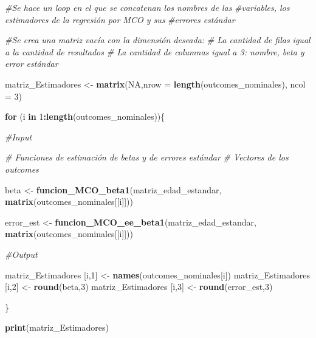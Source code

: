 \documentclass[
]{article}
\newenvironment{Shaded}{\begin{snugshade}}{\end{snugshade}}
\newcommand{\AttributeTok}[1]{\textcolor[rgb]{0.13,0.29,0.53}{#1}}
\newcommand{\CommentTok}[1]{\textcolor[rgb]{0.56,0.35,0.01}{\textit{#1}}}
\newcommand{\ConstantTok}[1]{\textcolor[rgb]{0.56,0.35,0.01}{#1}}
\newcommand{\ControlFlowTok}[1]{\textcolor[rgb]{0.13,0.29,0.53}{\textbf{#1}}}
\newcommand{\DecValTok}[1]{\textcolor[rgb]{0.00,0.00,0.81}{#1}}
\newcommand{\FunctionTok}[1]{\textcolor[rgb]{0.13,0.29,0.53}{\textbf{#1}}}
\newcommand{\NormalTok}[1]{#1}
\newcommand{\OtherTok}[1]{\textcolor[rgb]{0.56,0.35,0.01}{#1}}
\newcommand{\SpecialCharTok}[1]{\textcolor[rgb]{0.81,0.36,0.00}{\textbf{#1}}}
\begin{document}
\begin{Shaded}
\begin{Highlighting}[]
  \CommentTok{\#Se hace un loop en el que se concatenan los nombres de las}
  \CommentTok{\#variables, los estimadores de la regresión por MCO y sus}
  \CommentTok{\#errores estándar}
    
    \CommentTok{\#Se crea una matriz vacía con la dimensión deseada:}
    \CommentTok{\# La cantidad de filas igual a la cantidad de resultados}
    \CommentTok{\# La cantidad de columnas igual a 3: nombre, beta y error estándar}

\NormalTok{    matriz\_Estimadores }\OtherTok{\textless{}{-}} \FunctionTok{matrix}\NormalTok{(}\ConstantTok{NA}\NormalTok{,}\AttributeTok{nrow =} \FunctionTok{length}\NormalTok{(outcomes\_nominales),}
                                 \AttributeTok{ncol =} \DecValTok{3}\NormalTok{)}
    
    \ControlFlowTok{for}\NormalTok{ (i }\ControlFlowTok{in} \DecValTok{1}\SpecialCharTok{:}\FunctionTok{length}\NormalTok{(outcomes\_nominales))\{}
    
    \CommentTok{\#Input}
     
      \CommentTok{\# Funciones de estimación de betas y de errores estándar}
      \CommentTok{\# Vectores de los outcomes}
      
\NormalTok{      beta }\OtherTok{\textless{}{-}} \FunctionTok{funcion\_MCO\_beta1}\NormalTok{(matriz\_edad\_estandar,}
                                \FunctionTok{matrix}\NormalTok{(outcomes\_nominales[[i]]))}
      
\NormalTok{      error\_est }\OtherTok{\textless{}{-}} \FunctionTok{funcion\_MCO\_ee\_beta1}\NormalTok{(matriz\_edad\_estandar,}
                                \FunctionTok{matrix}\NormalTok{(outcomes\_nominales[[i]]))}
      
    \CommentTok{\#Output}
    
  
\NormalTok{      matriz\_Estimadores [i,}\DecValTok{1}\NormalTok{] }\OtherTok{\textless{}{-}}  \FunctionTok{names}\NormalTok{(outcomes\_nominales[i])}
\NormalTok{      matriz\_Estimadores [i,}\DecValTok{2}\NormalTok{] }\OtherTok{\textless{}{-}}  \FunctionTok{round}\NormalTok{(beta,}\DecValTok{3}\NormalTok{)}
\NormalTok{      matriz\_Estimadores [i,}\DecValTok{3}\NormalTok{] }\OtherTok{\textless{}{-}}  \FunctionTok{round}\NormalTok{(error\_est,}\DecValTok{3}\NormalTok{)}
     
\NormalTok{    \}}

\FunctionTok{print}\NormalTok{(matriz\_Estimadores)}
\end{Highlighting}
\end{Shaded}
\end{document}
